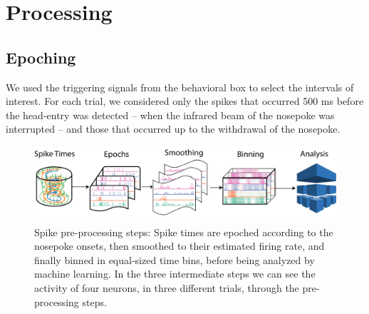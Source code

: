 \section{Processing}
\label{chap:processing}

\subsection{Epoching}
    We used the triggering signals from the behavioral box to select the intervals of interest. For each trial, we considered only the spikes that occurred 500 ms before the head-entry was detected -- when the infrared beam of the nosepoke was interrupted -- and those that occurred up to the withdrawal of the nosepoke. 
    
    \begin{figure}
        \centering
        \includegraphics[width=\textwidth]{figures/Pipeline.png}
        \caption[Spike pre-processing steps]{Spike pre-processing steps: Spike times are epoched according to the nosepoke onsets, then smoothed to their estimated firing rate, and finally binned in equal-sized time bins, before being analyzed by machine learning. In the three intermediate steps we can see the activity of four neurons, in three different trials, through the pre-processing steps.}
        \label{fig:preproc}
    \end{figure} 
    

